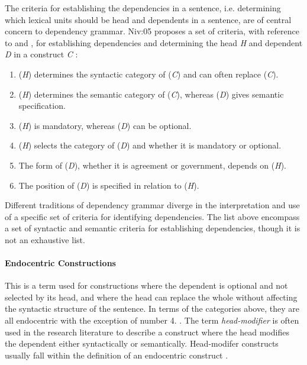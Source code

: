 The criteria for establishing the dependencies in a sentence, i.e. determining which lexical units should be head and dependents in a sentence, are of central concern to dependency grammar. \citeauthor{}{Niv:05} proposes a set of criteria, with reference to \citeauthor{Zwicky:85} and \citeauthor{Hudson:90}, for establishing dependencies and determining the head \textit{H} and dependent \textit{D} in a construct \textit{C} \cite{Zwicky:85, Hudson:90, Niv:05}:

\begin{enumerate}
\item (\textit{H}) determines the syntactic category of (\textit{C}) and can often replace (\textit{C}).
\item (\textit{H}) determines the semantic category of (\textit{C}), whereas (\textit{D}) gives semantic specification.
\item (\textit{H}) is mandatory, whereas (\textit{D}) can be optional.
\item (\textit{H}) selects the category of (\textit{D}) and whether it is mandatory or optional.
\item The form of (\textit{D}), whether it is agreement or government, depends on (\textit{H}).
\item The position of (\textit{D}) is specified in relation to (\textit{H}).
\end{enumerate}

Different traditions of dependency grammar diverge in the interpretation and use of a specific set of criteria for identifying dependencies. The list above encompass a set of syntactic and semantic criteria for establishing dependencies, though it is not an exhaustive list. 

\paragraph{Endocentric Constructions} This is a term used for constructions where the dependent is optional and not selected by its head, and where the head can replace the whole without affecting the syntactic structure of the sentence. In terms of the categories above, they are all endocentric with the exception of number 4. \cite{KublerEtAl:09}. The term \textit{head-modifier} is often used in the research literature to describe a construct where the head modifies the dependent either syntactically or semantically. Head-modifer constructs usually fall within the definition of an endocentric construct \cite{Niv:05}.

